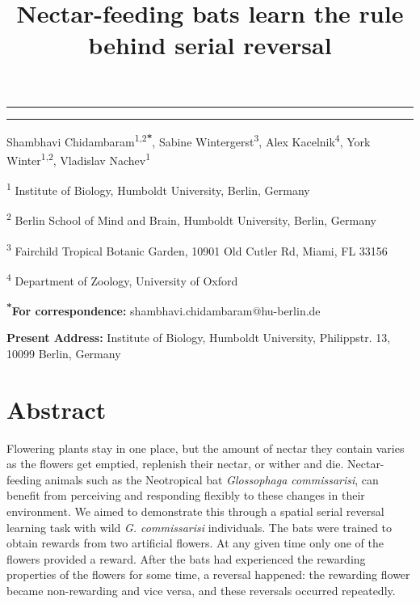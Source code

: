 \documentclass[
]{article}
\title{Nectar-feeding bats learn the rule behind serial reversal}
\author{}
\date{\vspace{-2.5em}}
\begin{document}
\maketitle

\begin{center}\rule{0.5\linewidth}{0.5pt}\end{center}

\begin{center}\rule{0.5\linewidth}{0.5pt}\end{center}

Shambhavi Chidambaram\textsuperscript{1,2\textbf{*}}, Sabine Wintergerst\textsuperscript{3}, Alex Kacelnik\textsuperscript{4}, York Winter\textsuperscript{1,2}, Vladislav Nachev\textsuperscript{1}

\textsuperscript{1} Institute of Biology, Humboldt University, Berlin, Germany

\textsuperscript{2} Berlin School of Mind and Brain, Humboldt University, Berlin, Germany

\textsuperscript{3} Fairchild Tropical Botanic Garden, 10901 Old Cutler Rd, Miami, FL 33156

\textsuperscript{4} Department of Zoology, University of Oxford

\textsuperscript{\textbf{*}}\textbf{For correspondence:} shambhavi.chidambaram@hu-berlin.de

\textbf{Present Address:} Institute of Biology, Humboldt University, Philippstr. 13, 10099 Berlin, Germany

\hypertarget{abstract}{%
\section{Abstract}\label{abstract}}

Flowering plants stay in one place, but the amount of nectar they contain varies as the flowers get emptied, replenish their nectar, or wither and die. Nectar-feeding animals such as the Neotropical bat \emph{Glossophaga commissarisi}, can benefit from perceiving and responding flexibly to these changes in their environment. We aimed to demonstrate this through a spatial serial reversal learning task with wild \emph{G. commissarisi} individuals. The bats were trained to obtain rewards from two artificial flowers. At any given time only one of the flowers provided a reward. After the bats had experienced the rewarding properties of the flowers for some time, a reversal happened: the rewarding flower became non-rewarding and vice versa, and these reversals occurred repeatedly.
\end{document}
